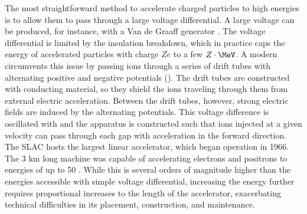 The most straightforward method to accelerate charged particles to high energies is to allow them to pass through a large voltage differential.
A large voltage can be produced, for instance, with a Van de Graaff generator \cite{PhysRev.43.149}.
The voltage differential is limited by the insulation breakdown, which in practice caps the energy of accelerated particles with charge $Ze$ to a few $Z \cdot\MeV$.
A modern \linac circumvents this issue by passing ions through a series of drift tubes with alternating positive and negative potentials ().
The drift tubes are constructed with conducting material, so they shield the ions traveling through them from external electric acceleration.
Between the drift tubes, however, strong electric fields are induced by the alternating potentials.
This voltage difference is oscillated with \rf and the apparatus is constructed such that ions injected at a given velocity can pass through each gap with acceleration in the forward direction.
The \ac{SLAC} hosts the largest linear accelerator, which began operation in 1966.
The 3 km long machine was capable of accelerating electrons and positrons to energies of up to 50 \GeV.
While this is several orders of magnitude higher than the energies accessible with simple voltage differential, increasing the energy further requires proportional increases to the length of the accelerator, exacerbating technical difficulties in its placement, construction, and maintenance.

